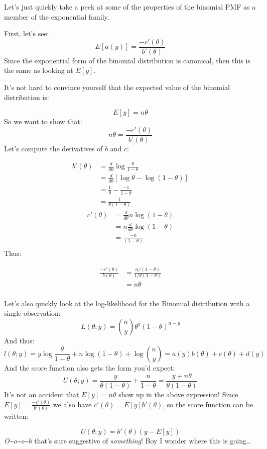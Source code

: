\documentclass[
]{article}
\begin{document}
Let's just quickly take a peek at some of the properties of the binomial
PMF as a member of the exponential family.

First, let's see: \[
E[a(y)] = \frac{-c'(\theta)}{b'(\theta)}
\] Since the exponential form of the binomial distribution is canonical,
then this is the same as looking at \(E[y]\).

It's not hard to convince yourself that the expected value of the
binomial distribution is:

\[
E[y] = n \theta
\] So we want to show that: \[
n\theta = \frac{-c'(\theta)}{b'(\theta)}
\] Let's compute the derivatives of \(b\) and \(c\):

\[
\begin{split}
b'(\theta) &= \frac{d}{d \theta} \log {\frac{\theta}{1 - \theta} }\\
&= \frac{d}{d \theta} [ \log{\theta} - \log{(1 - \theta)}]\\
&= \frac{1}{\theta}  - \frac{-1}{1 - \theta}\\
&= \frac{1}{\theta(1-\theta)}
\end{split}
\] \[
\begin{split}
c'(\theta) &= \frac{d}{d \theta} n\log {(1-\theta)}\\
&= n \frac{d}{d \theta} \log {(1-\theta)}\\
&= \frac{-n}{(1-\theta)}\\
\end{split}
\] Thus:

\[
\begin{split}
\frac{-c'(\theta)}{b(\theta)} &= \frac{n/(1-\theta)}{1/\theta(1-\theta)} \\
&= n\theta\\
\end{split}
\]

Let's also quickly look at the log-likelihood for the Binomial
distribution with a single observation: \[
L(\theta;y) = {n \choose y} \theta^y (1-\theta)^{n-y}
\] And thus: \[
l(\theta;y) = y \log{\frac{\theta}{1-\theta}} + n\log{(1-\theta)} + \log{n \choose y}  =a(y)b(\theta) + c(\theta) + d(y)
\] And the score function also gets the form you'd expect: \[
U(\theta;y) = \frac{y}{\theta(1-\theta)} + \frac{n}{1-\theta} = \frac{y + n\theta}{\theta (1-\theta)}
\] It's not an accident that \(E[y] = n \theta\) show up in the above
expression! Since \(E[y] = \frac{-c'(\theta)}{b'(\theta)}\) we also have
\(c'(\theta) = E[y] b'(\theta)\), so the score function can be written:

\[
U(\theta;y) = b'(\theta) (y - E[y])
\] \emph{O\textasciitilde o\textasciitilde o\textasciitilde h} that's
sure suggestive of \emph{something}! Boy I wonder where this is
going\ldots{}
\end{document}
